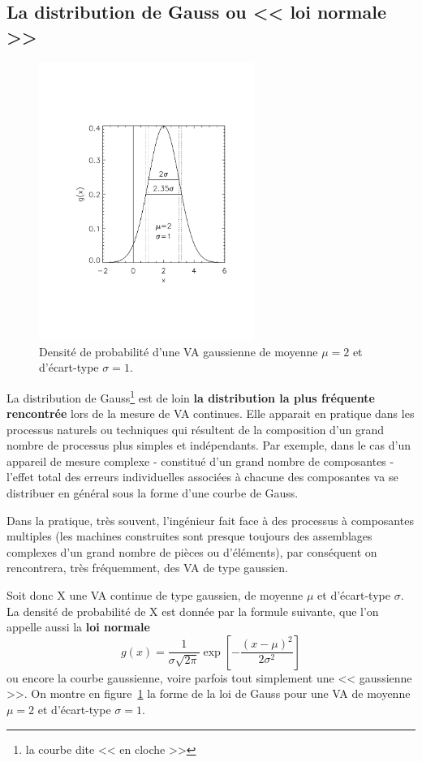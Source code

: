 \subsection{La distribution de Gauss ou << loi normale >>}

\begin{figure}[h!]
    \centering
    \includegraphics[width=7cm]{assets/figures/loiGaussienne.pdf}
    \caption{Densité de probabilité d'une VA gaussienne de moyenne $\mu=2$ et d'écart-type $\sigma=1$.}
    \label{fig:ddpdlldg}
\end{figure}
La distribution de Gauss\footnote{la courbe dite << en cloche >>} est de loin \textbf{la distribution la plus fréquente rencontrée} lors de la mesure de VA continues. Elle apparait en pratique dans les processus naturels ou techniques qui résultent de la composition d'un grand nombre de processus plus simples et indépendants. Par exemple, dans le cas d'un appareil de mesure complexe - constitué d'un grand nombre de composantes - l'effet total des erreurs individuelles associées à chacune des composantes va se distribuer en général sous la forme d'une courbe de Gauss.

Dans la pratique, très souvent, l'ingénieur fait face à des processus à composantes multiples (les machines construites sont presque toujours des assemblages complexes d'un grand nombre de pièces ou d'éléments), par conséquent on rencontrera, très fréquemment, des VA de type gaussien.

Soit donc X une VA continue de type gaussien, de moyenne $\mu$ et d'écart-type $\sigma$. La densité de probabilité de X est donnée par la formule suivante, que l'on appelle aussi la \textbf{loi normale}
\begin{equation}
    g(x)=\frac{1}{\sigma\sqrt{2\pi}}\exp{\left[-\frac{(x-\mu)^2}{2\sigma^2}\right]}
\end{equation}
ou encore la courbe gaussienne, voire parfois tout simplement une << gaussienne >>. On montre en figure~\ref{fig:ddpdlldg} la forme de la loi de Gauss pour une VA de moyenne $\mu=2$ et d'écart-type $\sigma=1$.

